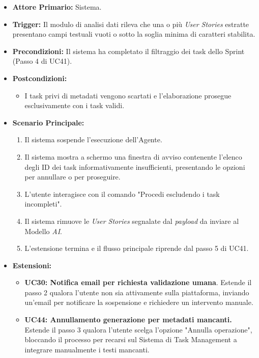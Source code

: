 \documentclass[12pt, a4paper]{article}
\begin{document}
\begin{itemize}
    \item \textbf{Attore Primario:} Sistema.
    \item \textbf{Trigger:} Il modulo di analisi dati rileva che una o più \textit{User Stories} estratte presentano campi testuali vuoti o sotto la soglia minima di caratteri stabilita.
    \item \textbf{Precondizioni:} Il sistema ha completato il filtraggio dei task dello Sprint (Passo 4 di UC41).
    \item \textbf{Postcondizioni:} 
    \begin{itemize}
        \item I task privi di metadati vengono scartati e l'elaborazione prosegue esclusivamente con i task validi.
    \end{itemize}
    \item \textbf{Scenario Principale:}
    \begin{enumerate}
        \item Il sistema sospende l'esecuzione dell'Agente.
        \item Il sistema mostra a schermo una finestra di avviso contenente l'elenco degli ID dei task informativamente insufficienti, presentando le opzioni per annullare o per proseguire.
        \item L'utente interagisce con il comando "Procedi escludendo i task incompleti".
        \item Il sistema rimuove le \textit{User Stories} segnalate dal \textit{payload} da inviare al Modello \textit{AI}.
        \item L'estensione termina e il flusso principale riprende dal passo 5 di UC41.
    \end{enumerate}
    \item \textbf{Estensioni:}
    \begin{itemize}
        \item \textbf{UC30: Notifica email per richiesta validazione umana}. Estende il passo 2 qualora l'utente non sia attivamente sulla piattaforma, inviando un'email per notificare la sospensione e richiedere un intervento manuale.
        \item \textbf{UC44: Annullamento generazione per metadati mancanti.} Estende il passo 3 qualora l'utente scelga l'opzione "Annulla operazione", bloccando il processo per recarsi sul Sistema di Task Management a integrare manualmente i testi mancanti.
    \end{itemize}
\end{itemize}
\end{document}
